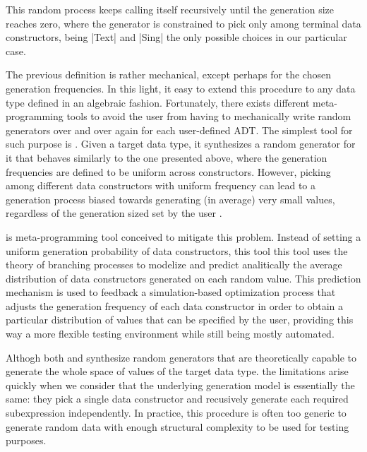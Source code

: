 This random process keeps calling itself recursively until the generation size
reaches zero, where the generator is constrained to pick only among terminal
data constructors, being |Text| and |Sing| the only possible choices in our
particular case.

%


The previous definition is rather mechanical, except perhaps for the chosen
generation frequencies.
%
In this light, it easy to extend this procedure to any data type defined in an
algebraic fashion.
%
Fortunately, there exists different meta-programming tools to avoid the user
from having to mechanically write random generators over and over again for each
user-defined ADT.
%
The simplest tool for such purpose is \megadeth \tocite.
%
Given a target data type, it synthesizes a random generator for it that behaves
similarly to the one presented above, where the generation frequencies are
defined to be uniform across constructors.
%
However, picking among different data constructors with uniform frequency can
lead to a generation process biased towards generating (in average) very small
values, regardless of the generation sized set by the user \tocite.


\dragen is meta-programming tool conceived to mitigate this problem.
%
Instead of setting a uniform generation probability of data constructors, this
tool this tool uses the theory of branching processes to modelize and predict
analitically the average distribution of data constructors generated on each
random value.
%
This prediction mechanism is used to feedback a simulation-based optimization
process that adjusts the generation frequency of each data constructor in order
to obtain a particular distribution of values that can be specified by the user,
providing this way a more flexible testing environment while still being mostly
automated.


Althogh both \megadeth and \dragen synthesize random generators that are
theoretically capable to generate the whole space of values of the target data
type. the limitations arise quickly when we consider that the underlying
generation model is essentially the same: they pick a single data constructor
and recusively generate each required subexpression independently.
%
In practice, this procedure is often too generic to generate random data with
enough structural complexity to be used for testing purposes.


